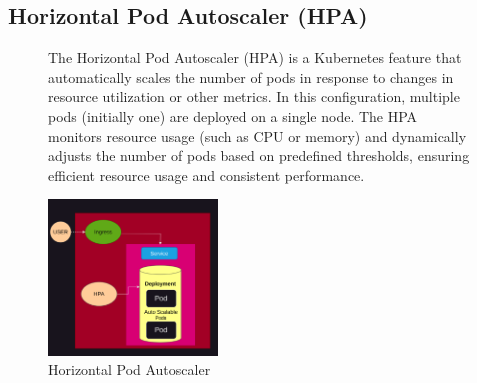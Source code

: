 \documentclass{article}
\begin{document}
\subsection{Horizontal Pod Autoscaler (HPA)}
\nobreak
\begin{figure}[h]
    \begin{minipage}[b]{0.6\textwidth}
        \flushleft
        The Horizontal Pod Autoscaler (HPA) is a Kubernetes feature that automatically
        scales the number of pods in response to changes in resource utilization or
        other metrics. In this configuration, multiple pods (initially one) are
        deployed on a single node. The HPA monitors resource usage (such as CPU or
        memory) and dynamically adjusts the number of pods based on predefined
        thresholds, ensuring efficient resource usage and consistent performance.
    \end{minipage}%
    \hfill
    \begin{minipage}[b]{0.4\textwidth}
        \centering
        \includegraphics[width=0.4\textwidth]{../images/hpa.png}
        \caption{Horizontal Pod Autoscaler}
        \label{fig:hpa}
    \end{minipage}
\end{figure}
\end{document}
